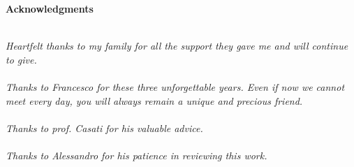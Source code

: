  \thispagestyle{empty}

\begin{center}
  {\bf \Huge Acknowledgments}
\end{center}

\vspace{4cm}


\emph{\\
  Heartfelt thanks to my family for all the support they gave me and will continue to give.\\ \\
  Thanks to Francesco for these three unforgettable years. Even if now we cannot meet every day, you will always remain a unique and precious friend.\\ \\
  Thanks to prof. Casati for his valuable advice.\\ \\
  Thanks to Alessandro for his patience in reviewing this work.\\
}